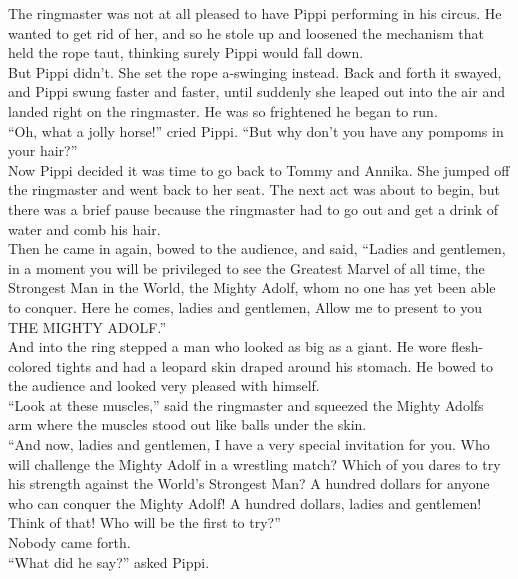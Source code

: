 \documentclass{standard}
\begin{document}
The ringmaster was not at all pleased to have Pippi performing in his circus. He wanted to get rid of her, and so he stole up and loosened the mechanism that held the rope taut, thinking surely Pippi would fall down.\\

But Pippi didn’t. She set the rope a-swinging instead. Back and forth it swayed, and Pippi swung faster and faster, until suddenly she leaped out into the air and landed right on the ringmaster. He was so frightened he began to run.\\

“Oh, what a jolly horse!” cried Pippi. “But why don’t you have any pompoms in your hair?”\\

Now Pippi decided it was time to go back to Tommy and Annika. She jumped off the ringmaster and went back to her seat. The next act was about to begin, but there was a brief pause because the ringmaster had to go out and get a drink of water and comb his hair.\\

Then he came in again, bowed to the audience, and said, “Ladies and gentlemen, in a moment you will be privileged to see the Greatest Marvel of all time, the Strongest Man in the World, the Mighty Adolf, whom no one has yet been able to conquer. Here he comes, ladies and gentlemen, Allow me to present to you THE MIGHTY ADOLF.”\\

And into the ring stepped a man who looked as big as a giant. He wore flesh- colored tights and had a leopard skin draped around his stomach. He bowed to the audience and looked very pleased with himself.\\

“Look at these muscles,” said the ringmaster and squeezed the Mighty Adolfs arm where the muscles stood out like balls under the skin.\\

“And now, ladies and gentlemen, I have a very special invitation for you. Who will challenge the Mighty Adolf in a wrestling match? Which of you dares to try his strength against the World’s Strongest Man? A hundred dollars for anyone who can conquer the Mighty Adolf! A hundred dollars, ladies and gentlemen! Think of that! Who will be the first to try?”\\

Nobody came forth.\\

“What did he say?” asked Pippi.\\
\end{document}
